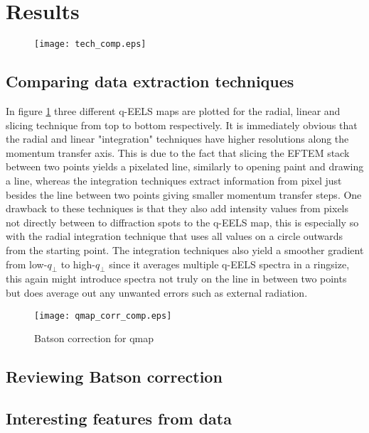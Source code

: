 \section{Results}
\begin{figure}[h!]
	\centering
	\texttt{[image: tech\_comp.eps]}
	\caption{}
	\label{fig:tech-comp}
\end{figure}%
%
\subsection{Comparing data extraction techniques}
In figure \ref{fig:tech-comp} three different q-EELS maps are plotted for the radial, linear and slicing technique from top to bottom respectively. It is immediately obvious that the radial and linear "integration" techniques have higher resolutions along the momentum transfer axis. This is due to the fact that slicing the EFTEM stack between two points yields a pixelated line, similarly to opening paint and drawing a line, whereas the integration techniques extract information from pixel just besides the line between two points giving smaller momentum transfer steps. One drawback to these techniques is that they also add intensity values from pixels not directly between to diffraction spots to the q-EELS map, this is especially so with the radial integration technique that uses all values on a circle outwards from the starting point.
The integration techniques also yield a smoother gradient from low-$q_{\perp}$ to high-$q_{\perp}$ since it averages multiple q-EELS spectra in a ringsize, this again might introduce spectra not truly on the line in between two points but does average out any unwanted errors such as external radiation.\\
\newpage%
%
\begin{figure}[h!]
	\centering
	\texttt{[image: qmap\_corr\_comp.eps]}
	\caption{Batson correction for qmap}
	\label{fig:bat-cor}
\end{figure}
%
\subsection{Reviewing Batson correction}



\subsection{Interesting features from data}

